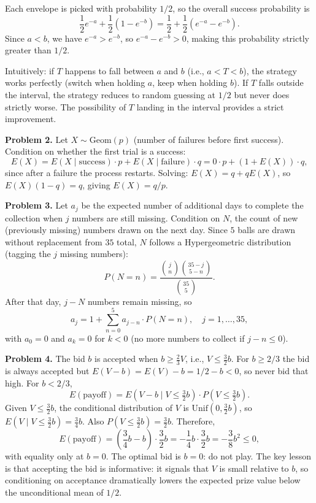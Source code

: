 \documentclass{article}
\begin{document}
Each envelope is picked with probability $1/2$, so the overall success probability is
$$
\frac{1}{2}e^{-a}+\frac{1}{2}(1-e^{-b}) = \frac{1}{2}+\frac{1}{2}(e^{-a}-e^{-b}).
$$
Since $a<b$, we have $e^{-a}>e^{-b}$, so $e^{-a}-e^{-b}>0$, making this probability strictly greater than $1/2$.

Intuitively: if $T$ happens to fall between $a$ and $b$ (i.e., $a<T<b$), the strategy works perfectly (switch when holding $a$, keep when holding $b$). If $T$ falls outside the interval, the strategy reduces to random guessing at $1/2$ but never does strictly worse. The possibility of $T$ landing in the interval provides a strict improvement.

\bigskip
\textbf{Problem 2.} Let $X\sim\text{Geom}(p)$ (number of failures before first success). Condition on whether the first trial is a success:
$$
E(X) = E(X\mid\text{success})\cdot p + E(X\mid\text{failure})\cdot q = 0\cdot p + (1+E(X))\cdot q,
$$
since after a failure the process restarts. Solving: $E(X)=q+qE(X)$, so $E(X)(1-q)=q$, giving $E(X)=q/p$.

\bigskip
\textbf{Problem 3.} Let $a_j$ be the expected number of additional days to complete the collection when $j$ numbers are still missing. Condition on $N$, the count of new (previously missing) numbers drawn on the next day. Since $5$ balls are drawn without replacement from $35$ total, $N$ follows a Hypergeometric distribution (tagging the $j$ missing numbers):
$$
P(N=n) = \frac{\binom{j}{n}\binom{35-j}{5-n}}{\binom{35}{5}}.
$$
After that day, $j-N$ numbers remain missing, so
$$
a_j = 1 + \sum_{n=0}^{5}a_{j-n}\cdot P(N=n), \quad j=1,\dots,35,
$$
with $a_0=0$ and $a_k=0$ for $k<0$ (no more numbers to collect if $j-n\le0$).

\bigskip
\textbf{Problem 4.} The bid $b$ is accepted when $b\ge\frac{2}{3}V$, i.e., $V\le\frac{3}{2}b$. For $b\ge2/3$ the bid is always accepted but $E(V-b)=E(V)-b=1/2-b<0$, so never bid that high. For $b<2/3$,
$$
E(\text{payoff}) = E(V-b\mid V\le\tfrac{3}{2}b)\cdot P(V\le\tfrac{3}{2}b).
$$
Given $V\le\frac{3}{2}b$, the conditional distribution of $V$ is $\text{Unif}(0,\frac{3}{2}b)$, so $E(V\mid V\le\frac{3}{2}b)=\frac{3}{4}b$. Also $P(V\le\frac{3}{2}b)=\frac{3}{2}b$. Therefore,
$$
E(\text{payoff}) = \left(\frac{3}{4}b-b\right)\cdot\frac{3}{2}b = -\frac{1}{4}b\cdot\frac{3}{2}b = -\frac{3}{8}b^2 \le 0,
$$
with equality only at $b=0$. The optimal bid is $b=0$: do not play. The key lesson is that accepting the bid is informative: it signals that $V$ is small relative to $b$, so conditioning on acceptance dramatically lowers the expected prize value below the unconditional mean of $1/2$.
\end{document}
